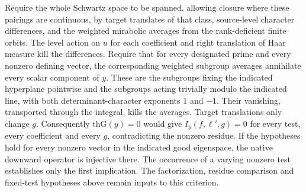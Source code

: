 Require the whole Schwartz space to be spanned, allowing closure
where these pairings are continuous, by target translates of that
class, source-level character differences, and the weighted
mirabolic averages from the rank-deficient finite orbits.
The level action on $u$ for each coefficient and right translation
of Haar measure kill the differences. Require that for every
designated prime and every nonzero defining vector, the corresponding
weighted subgroup averages annihilate every scalar component of $y$.
These are the subgroups fixing the indicated hyperplane pointwise
and the subgroups acting trivially modulo the indicated line,
with both determinant-character exponents $1$ and $-1$.
Their vanishing, transported through the integral, kills the
averages. Target translations only change $g$.
Consequently $\mathrm{thG}(y)=0$ would give $I_y(f,\ell',g)=0$
for every test, every coefficient and every $g$, contradicting the
nonzero residue. If the hypotheses hold for every nonzero vector in
the indicated good eigenspace, the native downward operator is
injective there. The occurrence of a varying nonzero test establishes
only the first implication. The factorization, residue comparison
and fixed-test hypotheses above remain inputs to this criterion.
